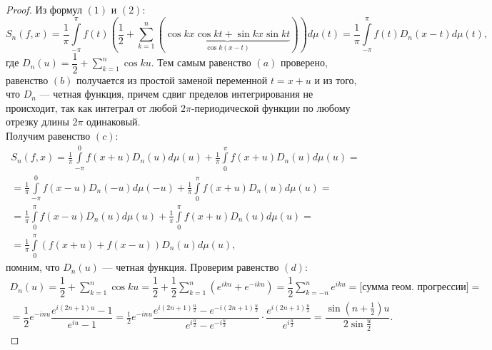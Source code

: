 \begin{proof}
	Из формул $(1)$ и $(2)$:
	$$S_n(f,x)=\frac{1}{\pi}\int\limits_{-\pi}^\pi f(t)\left(\frac{1}{2}+\sum\limits_{k=1}^n(\underbrace{\cos kx \cos kt+\sin kx\sin kt}_{\cos k(x-t)})\right)d\mu(t)=\frac{1}{\pi}\int\limits_{-\pi}^\pi f(t)D_n(x-t)d\mu(t), $$ где $D_n(u)=\dfrac{1}{2}+\sum\limits_{k=1}^n\cos ku$. Тем самым равенство $(a)$ проверено, равенство $(b)$ получается из простой заменой переменной $t=x+u$ и из того, что $D_n$ --- четная функция, причем сдвиг пределов интегрирования не происходит, так как интеграл от любой $2\pi$-периодической функции по любому отрезку длины $2\pi$ одинаковый.\\
	Получим равенство $(c)$:
	\begin{multline*}
		S_n(f,x)=\frac{1}{\pi}\int\limits_{-\pi}^0 f(x+u)D_n(u)d\mu(u)+
		\frac{1}{\pi}\int\limits_{0}^\pi f(x+u)D_n(u)d\mu(u)=\\=
		\frac{1}{\pi}\int\limits_{-\pi}^0 f(x-u)D_n(-u)d\mu(-u)+
		\frac{1}{\pi}\int\limits_{0}^\pi f(x+u)D_n(u)d\mu(u)=\\=
		\frac{1}{\pi}\int\limits_{0}^\pi f(x-u)D_n(u)d\mu(u)+
		\frac{1}{\pi}\int\limits_{0}^\pi f(x+u)D_n(u)d\mu(u)=\\=
		\frac{1}{\pi}\int\limits_{0}^\pi(f(x+u)+f(x-u))D_n(u)d\mu(u),
	\end{multline*}
помним, что $D_n(u)$ --- четная функция.
	Проверим равенство $(d)$:
	\begin{multline*}
		D_n(u)=\dfrac{1}{2}+\sum\limits_{k=1}^n\cos ku=\dfrac{1}{2}+\dfrac{1}{2}\sum\limits_{k=1}^n(e^{iku}+e^{-iku})=\dfrac{1}{2}\sum\limits_{k=-n}^ne^{iku}=\text{[сумма геом. прогрессии]}=\\=\dfrac{1}{2}e^{-inu}\dfrac{e^{i(2n+1)u}-1}{e^{iu}-1}=\frac{1}{2}e^{-inu}\dfrac{e^{i(2n+1)\frac{u}{2}}-e^{-i(2n+1)\frac{u}{2}}}{e^{i\frac{u}{2}}-e^{-i\frac{u}{2}}}\cdot\dfrac{e^{i(2n+1)\frac{u}{2}}}{e^{i\frac{u}{2}}}=\dfrac{\sin(n+\frac{1}{2})u}{2\sin\frac{u}{2}}.
	\end{multline*}
\end{proof}

